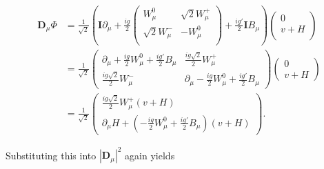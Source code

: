 \documentclass{article}
\begin{document}
\begin{equation}
\begin{split}
\bm{D}_\mu \Phi &= \frac{1}{\sqrt{2}}\left(\bm{I}\partial_\mu+ \frac{ig}{2}\left(\begin{matrix}
W^{0}_\mu & \sqrt{2}W^{+}_\mu \\
\sqrt{2}W^{-}_\mu & -W^{0}_\mu\\
\end{matrix}\right) + \frac{ig'}{2}\bm{I}B_\mu\right)\left(\begin{matrix}
0 \\
v + H\\
\end{matrix}\right) \\
& = \frac{1}{\sqrt{2}}\left(  \begin{matrix}
\partial_\mu + \frac{ig}{2}W^{0}_\mu + \frac{ig'}{2}B_\mu & \frac{ig\sqrt{2}}{2}W^{+}_\mu \\
\frac{ig\sqrt{2}}{2}W^{-}_\mu & \partial_\mu - \frac{ig}{2}W^{0}_\mu + \frac{ig'}{2}B_\mu
\end{matrix}\right)\left(\begin{matrix}
0 \\
v + H
\end{matrix}\right) \\
& = \frac{1}{\sqrt{2}}\left(\begin{matrix}
\frac{ig\sqrt{2}}{2}W^{+}_\mu (v+H)\\
\partial_\mu H + \left(-\frac{ig}{2}W^{0}_\mu  + \frac{ig'}{2}B_\mu\right)(v+H)
\end{matrix}\right).
\end{split}
\end{equation}

Substituting this into $|\bm{D}_\mu|^2$ again yields
\end{document}
